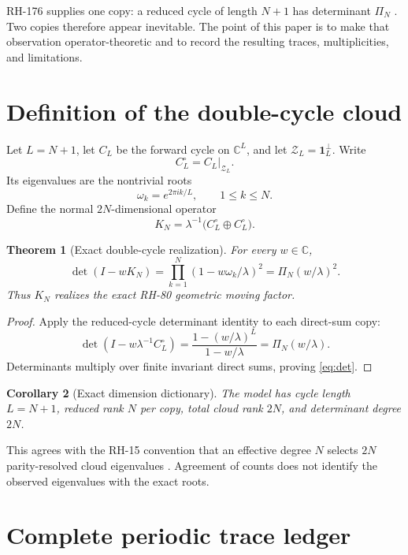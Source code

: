 \documentclass[12pt]{article}
\newtheorem{theorem}{Theorem}[section]
\newtheorem{corollary}[theorem]{Corollary}
\theoremstyle{remark}
\newcommand{\cZ}{\mathcal Z}
\begin{document}
RH-176 supplies one copy: a reduced cycle of length $N+1$ has determinant
$\Pi_N$ \citep{WangRH176}.  Two copies therefore appear inevitable.  The
point of this paper is to make that observation operator-theoretic and to
record the resulting traces, multiplicities, and limitations.

\section{Definition of the double-cycle cloud}

Let $L=N+1$, let $C_L$ be the forward cycle on $\mathbb C^L$, and let
$\cZ_L=\mathbf1_L^\perp$.  Write
\[
 C_L^\circ=C_L|_{\cZ_L}.
\]
Its eigenvalues are the nontrivial roots
\[
 \omega_k=e^{2\pi ik/L},
 \qquad 1\le k\le N.
\]
Define the normal $2N$-dimensional operator
\begin{equation}\label{eq:K}
 K_N=\lambda^{-1}
 \bigl(C_L^\circ\oplus C_L^\circ\bigr).
\end{equation}

\begin{theorem}[Exact double-cycle realization]\label{thm:det}
For every $w\in\mathbb C$,
\begin{equation}\label{eq:det}
 \det(I-wK_N)
 =\prod_{k=1}^N(1-w\omega_k/\lambda)^2
 =\Pi_N(w/\lambda)^2.
\end{equation}
Thus $K_N$ realizes the exact RH-80 geometric moving factor.
\end{theorem}

\begin{proof}
Apply the reduced-cycle determinant identity to each direct-sum copy:
\[
 \det(I-w\lambda^{-1}C_L^\circ)
 =\frac{1-(w/\lambda)^L}{1-w/\lambda}
 =\Pi_N(w/\lambda).
\]
Determinants multiply over finite invariant direct sums, proving
\eqref{eq:det}.
\end{proof}

\begin{corollary}[Exact dimension dictionary]
The model has cycle length $L=N+1$, reduced rank $N$ per copy, total cloud
rank $2N$, and determinant degree $2N$.
\end{corollary}

This agrees with the RH-15 convention that an effective degree $N$ selects
$2N$ parity-resolved cloud eigenvalues \citep{WangRH15}.  Agreement of counts
does not identify the observed eigenvalues with the exact roots.

\section{Complete periodic trace ledger}
\end{document}
